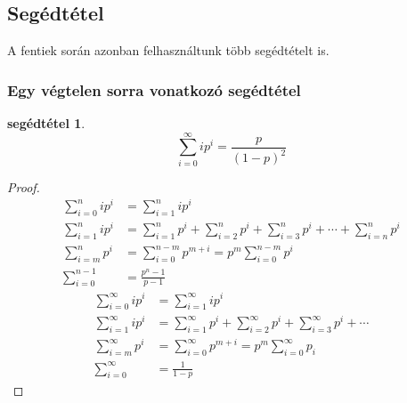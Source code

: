 \documentclass{article}
\newtheorem{lemm}{segédtétel}
\newcommand{\parenthesed}[1]{\left(#1\right)}
\begin{document}
	\subsection{Segédtétel}

	A fentiek során azonban felhasználtunk több segédtételt is.

	\subsubsection{Egy végtelen sorra vonatkozó segédtétel}
	\begin{lemm}
		\begin{equation}
			\sum_{i=0}^\infty ip^i = \frac p {\parenthesed{1-p}^2}
		\end{equation}
	\end{lemm}
	\begin{proof}
		\begin{align}
			\sum_{i=0}^n ip^i &= \sum_{i=1}^n ip^i\\
			\sum_{i=1}^n ip^i &= \sum_{i=1}^n p^i + \sum_{i=2}^n p^i + \sum_{i=3}^n p^i + \cdots + \sum_{i=n}^n p^i\\
			\sum_{i=m}^n p^i        &= \sum_{i=0}^{n-m} p^{m+i} = p^m \sum_{i=0}^{n-m}p^i\\
			\sum_{i=0}^{n-1}        &= \frac{p^n-1}{p-1}
		\end{align}
		\begin{align}
			\sum_{i=0}^\infty ip^i &= \sum_{i=1}^\infty ip^i\\
			\sum_{i=1}^\infty ip^i &= \sum_{i=1}^\infty p^i + \sum_{i=2}^\infty p^i + \sum_{i=3}^\infty p^i + \cdots\\
			\sum_{i=m}^\infty p^i  &= \sum_{i=0}^\infty p^{m+i} = p^m\sum_{i=0}^\infty p_i\\
			\sum_{i=0}^\infty      &= \frac1{1-p}
		\end{align}
		\begin{comment}
			\begin{align}
				\sum_{i=0}^\infty ip^i = \sum_{i=1}^\infty ip^i &= &  &    & &\sum_{i=1}^\infty p^i + {} &    &\sum_{i=2}^\infty p^i + {} &    &\sum_{i=3}^\infty p^i + \cdots\\
							                        &= &  &p^1 & &\sum_{i=0}^\infty p^i + {} & p^2&\sum_{i=0}^\infty p^i + {} & p^3&\sum_{i=0}^\infty p^i + \cdots\\
							                        &= & (&p^1 & &{}                    + {} & &p^2&{} + &p^3 + \cdots)\sum
			\end{align}
		\end{comment}

\end{proof}
\end{document}
